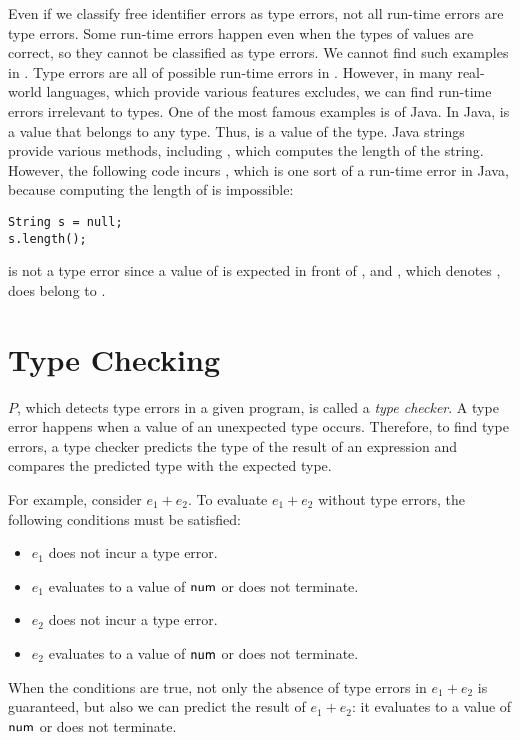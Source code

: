 Even if we classify free identifier errors as type errors, not all run-time
errors are type errors. Some run-time errors happen even when the types of
values are correct, so they cannot be classified as type errors. We cannot find
such examples in \plang. Type errors are all of possible run-time errors in
\plang. However, in many real-world languages, which provide various features
\plang excludes, we can find run-time errors irrelevant to types. One of the
most famous examples is  of Java. In Java,
 is a value that belongs to any type. Thus,  is a value of the 
type. Java strings provide various methods, including , which
computes the length of the string. However, the following code incurs
, which is one sort of a run-time error in Java,
because computing the length of  is impossible:

\begin{verbatim}
String s = null;
s.length();
\end{verbatim}

 is not a type error since a value of  is
expected in front of , and , which denotes ,
does belong to .

\section{Type Checking}

$P$, which detects type errors in a given program, is called a \textit{type
checker}. A type error happens when a value of an unexpected
type occurs. Therefore, to find type errors, a type checker predicts the type
of the result of an expression and compares the predicted type with the expected
type.

For example, consider $e_1+e_2$. To evaluate $e_1+e_2$
without type errors, the following conditions must be satisfied:
\begin{itemize}
  \item $e_1$ does not incur a type error.
  \item $e_1$ evaluates to a value of $\textsf{num}$ or does not terminate.
  \item $e_2$ does not incur a type error.
  \item $e_2$ evaluates to a value of $\textsf{num}$ or does not terminate.
\end{itemize}
When the conditions are true, not only the absence of type errors in $e_1+e_2$
is guaranteed, but also we can predict the result of $e_1+e_2$:
it evaluates to a value of $\textsf{num}$ or does not terminate.

